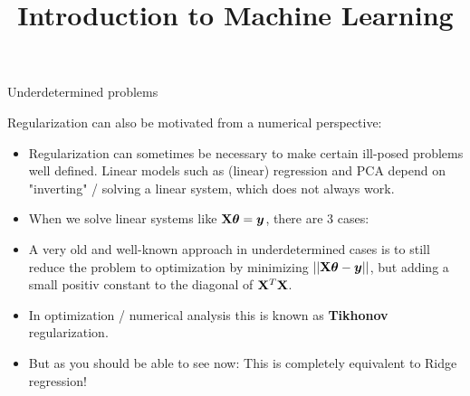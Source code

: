 \documentclass[11pt,compress,t,notes=noshow, xcolor=table]{beamer}
\title{Introduction to Machine Learning}
\date{}
\begin{document}


\begin{vbframe} {Underdetermined problems}

Regularization can also be motivated from a numerical perspective: 

  \begin{itemize}
    \item Regularization can sometimes be necessary to make certain ill-posed problems well defined. Linear models such as (linear) regression and PCA depend on "inverting" / solving a linear system, which does not always work.
    \item When we solve linear systems like $\mathbf{X} \bm{\theta} = \bm{y}$, there are 3 cases:  
  \begin{enumerate}
  \end{enumerate}
  \end{itemize}

\framebreak
  \begin{itemize}
   \item A very old and well-known approach in underdetermined cases is to still reduce the problem to optimization by minimizing $|| \mathbf{X} \bm{\theta} - \bm{y}||$, but adding a small positiv constant to the diagonal of $\mathbf{X}^T \mathbf{X}$.
   \item In optimization / numerical analysis this is known as \textbf{Tikhonov} regularization. 
   \item But as you should be able to see now: This is completely equivalent to Ridge regression!
  \end{itemize}


\end{vbframe}
\end{document}
